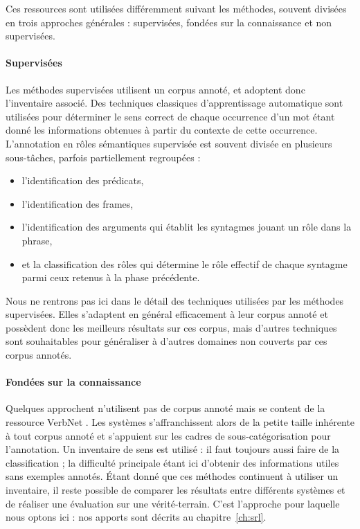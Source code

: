 Ces ressources sont utilisées différemment suivant les méthodes, souvent
divisées en trois approches générales : supervisées, fondées sur la
connaissance et non supervisées.

\paragraph{Supervisées}

Les méthodes supervisées
\citep{gildea2002automatic,surdeanu2008conll,das2014frame,hermann2014semantic,lluis2014shortest}
utilisent un corpus annoté, et adoptent donc l'inventaire associé. Des
techniques classiques d'apprentissage automatique sont utilisées pour
déterminer le sens correct de chaque occurrence d'un mot étant donné les
informations obtenues à partir du contexte de cette occurrence.  L'annotation
en rôles sémantiques supervisée est souvent divisée en plusieurs sous-tâches,
parfois partiellement regroupées :

\begin{itemize}
    \item l'identification des prédicats,
    \item l'identification des frames,
    \item l'identification des arguments qui établit les syntagmes jouant un rôle dans la phrase,
    \item et la classification des rôles qui détermine le rôle effectif de
chaque syntagme parmi ceux retenus à la phase précédente.
\end{itemize}

Nous ne rentrons pas ici dans le détail des techniques utilisées par les
méthodes supervisées. Elles s'adaptent en général efficacement à leur corpus
annoté et possèdent donc les meilleurs résultats sur ces corpus, mais d'autres
techniques sont souhaitables pour généraliser à d'autres domaines non couverts
par ces corpus annotés.


\paragraph{Fondées sur la connaissance}

Quelques approchent n'utilisent pas de corpus annoté mais se content de la
ressource VerbNet
\citep{swier2004unsupervised,swier2005exploiting,pradet2013revisiting}. Les
systèmes s'affranchissent alors de la petite taille inhérente à tout corpus
annoté et s'appuient sur les cadres de sous-catégorisation pour l'annotation.
Un inventaire de sens est utilisé : il faut toujours aussi faire de la
classification ; la difficulté principale étant ici d'obtenir des informations
utiles sans exemples annotés. Étant donné que ces méthodes continuent à
utiliser un inventaire, il reste possible de comparer les résultats entre
différents systèmes et de réaliser une évaluation sur une vérité-terrain. C'est
l'approche pour laquelle nous optons ici : nos apports sont décrits au
chapitre~\ref{ch:srl}.

